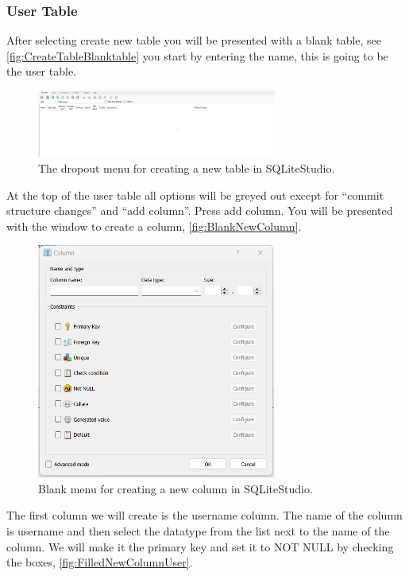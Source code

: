 \documentclass[a4paper,11pt,oneside]{article}
\begin{document}
\begin{sloppypar}
\subsubsection{User Table}
\label{sqliteStudioUserTable}
After selecting create new table you will be presented with a blank table, see \autoref{fig:CreateTableBlanktable} you start by entering the name, this is going to be the user table.
\begin{figure}[!htb]
  \centering
  \includegraphics[width=0.7\textwidth]{sqlitestudio/create_table/create_table_blank.png}
  \caption{The dropout menu for creating a new table in SQLiteStudio.}
  \label{fig:CreateTableBlanktable}
\end{figure}
At the top of the user table all options will be greyed out except for ``commit structure changes'' and ``add column''. Press add column. You will be presented with the window to create a column, \autoref{fig:BlankNewColumn}. 
\begin{figure}[!htb]
  \centering
  \includegraphics[width=0.7\textwidth]{sqlitestudio/create_table/create_table_column_blank.png}
  \caption{Blank menu for creating a new column in SQLiteStudio.}
  \label{fig:BlankNewColumn}
\end{figure}
The first column we will create is the username column. The name of the column is username and then select the datatype from the list next to the name of the column. We will make it the primary key and set it to NOT NULL by checking the boxes, \autoref{fig:FilledNewColumnUser}. 

\end{sloppypar}
\end{document}
